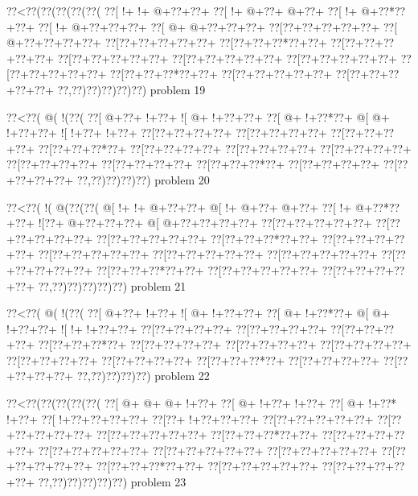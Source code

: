 \vbox{\vbox{\goo
\0??<\0??(\0??(\0??(\0??(\0??(
\0??[\- !+\- !+\- @+\0??+\0??+
\0??[\- !+\- @+\0??+\- @+\0??+
\0??[\- !+\- @+\0??*\0??+\0??+
\0??[\- !+\- @+\0??+\0??+\0??+
\0??[\- @+\- @+\0??+\0??+\0??+
\0??[\0??+\0??+\0??+\0??+\0??+
\0??[\- @+\0??+\0??+\0??+\0??+
\0??[\0??+\0??+\0??+\0??+\0??+
\0??[\0??+\0??+\0??*\0??+\0??+
\0??[\0??+\0??+\0??+\0??+\0??+
\0??[\0??+\0??+\0??+\0??+\0??+
\0??[\0??+\0??+\0??+\0??+\0??+
\0??[\0??+\0??+\0??+\0??+\0??+
\0??[\0??+\0??+\0??+\0??+\0??+
\0??[\0??+\0??+\0??*\0??+\0??+
\0??[\0??+\0??+\0??+\0??+\0??+
\0??[\0??+\0??+\0??+\0??+\0??+
\0??,\0??)\0??)\0??)\0??)\0??)
}
\hfil problem 19\hfil\break
}

\vbox{\vbox{\goo
\0??<\0??(\- @(\- !(\0??(
\0??[\- @+\0??+\- !+\0??+
\- ![\- @+\- !+\0??+\0??+
\0??[\- @+\- !+\0??*\0??+
\- @[\- @+\- !+\0??+\0??+
\- ![\- !+\0??+\- !+\0??+
\0??[\0??+\0??+\0??+\0??+
\0??[\0??+\0??+\0??+\0??+
\0??[\0??+\0??+\0??+\0??+
\0??[\0??+\0??+\0??*\0??+
\0??[\0??+\0??+\0??+\0??+
\0??[\0??+\0??+\0??+\0??+
\0??[\0??+\0??+\0??+\0??+
\0??[\0??+\0??+\0??+\0??+
\0??[\0??+\0??+\0??+\0??+
\0??[\0??+\0??+\0??*\0??+
\0??[\0??+\0??+\0??+\0??+
\0??[\0??+\0??+\0??+\0??+
\0??,\0??)\0??)\0??)\0??)
}
\hfil problem 20\hfil\break
}

\vbox{\vbox{\goo
\0??<\0??(\- !(\- @(\0??(\0??(
\- @[\- !+\- !+\- @+\0??+\0??+
\- @[\- !+\- @+\0??+\- @+\0??+
\0??[\- !+\- @+\0??*\0??+\0??+
\- ![\0??+\- @+\0??+\0??+\0??+
\- @[\- @+\0??+\0??+\0??+\0??+
\0??[\0??+\0??+\0??+\0??+\0??+
\0??[\0??+\0??+\0??+\0??+\0??+
\0??[\0??+\0??+\0??+\0??+\0??+
\0??[\0??+\0??+\0??*\0??+\0??+
\0??[\0??+\0??+\0??+\0??+\0??+
\0??[\0??+\0??+\0??+\0??+\0??+
\0??[\0??+\0??+\0??+\0??+\0??+
\0??[\0??+\0??+\0??+\0??+\0??+
\0??[\0??+\0??+\0??+\0??+\0??+
\0??[\0??+\0??+\0??*\0??+\0??+
\0??[\0??+\0??+\0??+\0??+\0??+
\0??[\0??+\0??+\0??+\0??+\0??+
\0??,\0??)\0??)\0??)\0??)\0??)
}
\hfil problem 21\hfil\break
}

\vbox{\vbox{\goo
\0??<\0??(\- @(\- !(\0??(
\0??[\- @+\0??+\- !+\0??+
\- ![\- @+\- !+\0??+\0??+
\0??[\- @+\- !+\0??*\0??+
\- @[\- @+\- !+\0??+\0??+
\- ![\- !+\- !+\0??+\0??+
\0??[\0??+\0??+\0??+\0??+
\0??[\0??+\0??+\0??+\0??+
\0??[\0??+\0??+\0??+\0??+
\0??[\0??+\0??+\0??*\0??+
\0??[\0??+\0??+\0??+\0??+
\0??[\0??+\0??+\0??+\0??+
\0??[\0??+\0??+\0??+\0??+
\0??[\0??+\0??+\0??+\0??+
\0??[\0??+\0??+\0??+\0??+
\0??[\0??+\0??+\0??*\0??+
\0??[\0??+\0??+\0??+\0??+
\0??[\0??+\0??+\0??+\0??+
\0??,\0??)\0??)\0??)\0??)
}
\hfil problem 22\hfil\break
}

\vbox{\vbox{\goo
\0??<\0??(\0??(\0??(\0??(\0??(
\0??[\- @+\- @+\- @+\- !+\0??+
\0??[\- @+\- !+\0??+\- !+\0??+
\0??[\- @+\- !+\0??*\- !+\0??+
\0??[\- !+\0??+\0??+\0??+\0??+
\0??[\0??+\- !+\0??+\0??+\0??+
\0??[\0??+\0??+\0??+\0??+\0??+
\0??[\0??+\0??+\0??+\0??+\0??+
\0??[\0??+\0??+\0??+\0??+\0??+
\0??[\0??+\0??+\0??*\0??+\0??+
\0??[\0??+\0??+\0??+\0??+\0??+
\0??[\0??+\0??+\0??+\0??+\0??+
\0??[\0??+\0??+\0??+\0??+\0??+
\0??[\0??+\0??+\0??+\0??+\0??+
\0??[\0??+\0??+\0??+\0??+\0??+
\0??[\0??+\0??+\0??*\0??+\0??+
\0??[\0??+\0??+\0??+\0??+\0??+
\0??[\0??+\0??+\0??+\0??+\0??+
\0??,\0??)\0??)\0??)\0??)\0??)
}
\hfil problem 23\hfil\break
}

